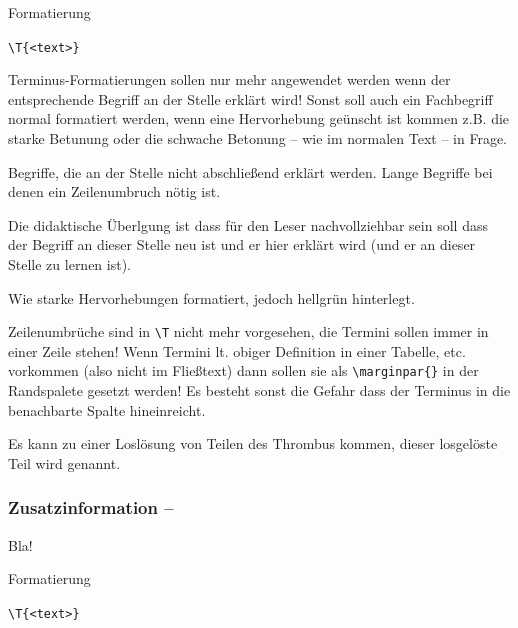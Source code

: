 \documentclass[ngerman,paper=a4,fontsize=8pt,headings=small,draft=no,parskip=half,noonelinecaption]{scrreprt}
\begin{document}
\begin{labeling}[~--]{Formatierung~~~}
  \item[Syntax:] \lstinline$\T{<text>}$
  \item[Beschreibung:]
  \item[Ja:] Terminus-Formatierungen sollen nur mehr angewendet werden
  wenn der entsprechende Begriff an der Stelle erklärt wird! Sonst soll auch
  ein Fachbegriff normal formatiert werden, wenn eine Hervorhebung geünscht
  ist kommen z.B. die starke Betunung oder die schwache
  Betonung -- wie im normalen Text -- in Frage.
  \item[Nein:] Begriffe, die an der Stelle nicht
  abschließend erklärt werden. Lange Begriffe bei denen ein Zeilenumbruch
  nötig ist.
  \item[Anmerkungen:] Die didaktische Überlgung ist dass für den Leser
  nachvollziehbar sein soll dass der Begriff an dieser Stelle neu ist und er
  hier erklärt wird (und er an dieser Stelle zu lernen ist).
  \item[Formatierung:] Wie starke Hervorhebungen formatiert,
  jedoch hellgrün hinterlegt.
  \item[Cave:] Zeilenumbrüche sind in \lstinline$\T$ nicht mehr vorgesehen, die Termini sollen
  immer in einer Zeile stehen! Wenn Termini lt. obiger Definition in einer
  Tabelle, etc. vorkommen (also nicht im Fließtext) dann sollen sie als
  \lstinline$\marginpar{}$ in der Randspalete gesetzt werden! Es besteht sonst
  die Gefahr dass der Terminus in die benachbarte Spalte hineinreicht.
\end{labeling}


{

Es kann zu einer Loslösung von Teilen des Thrombus kommen, dieser
losgelöste Teil wird  genannt.}





\subsubsection{Zusatzinformation -- }




Bla!
\begin{labeling}[~--]{Formatierung~~~}
  \item[Syntax:] \lstinline$\T{<text>}$
  \item[Beschreibung:]
  \item[Ja:] 
  \item[Nein:] 
  \item[Anmerkungen:] 
  \item[Formatierung:] 
  \item[Cave:] 
\end{labeling}
\end{document}
